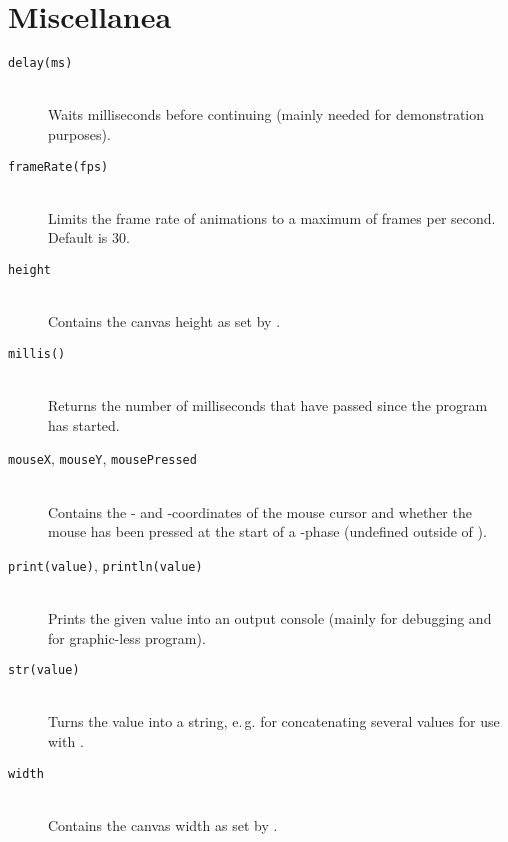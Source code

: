 \section{Miscellanea}
\begin{description}
\item[\texttt{delay(ms)}] \hfill \\
	Waits  milliseconds before continuing (mainly needed for demonstration purposes).
\item[\texttt{frameRate(fps)}] \hfill \\
	Limits the frame rate of animations to a maximum of  frames per second. Default is 30.
\item[\texttt{height}] \hfill \\
	Contains the canvas height as set by .
\item[\texttt{millis()}] \hfill \\
	Returns the number of milliseconds that have passed since the program has started.
\item[\texttt{mouseX}, \texttt{mouseY}, \texttt{mousePressed}] \hfill \\
	Contains the - and -coordinates of the mouse cursor and whether the mouse has been pressed at the start of a -phase (undefined outside of ).
\item[\texttt{print(value)}, \texttt{println(value)}] \hfill \\
	Prints the given value into an output console (mainly for debugging and for graphic-less program).
\item[\texttt{str(value)}] \hfill \\
	Turns the value into a string, e.\,g. for concatenating several values for use with .
\item[\texttt{width}] \hfill \\
	Contains the canvas width as set by .
\end{description}
